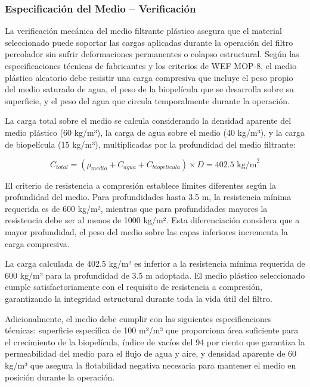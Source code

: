 \documentclass[12pt,a4paper]{article}
\begin{document}
\subsubsection{Especificación del Medio -- Verificación}

La verificación mecánica del medio filtrante plástico asegura que el material seleccionado puede soportar las cargas aplicadas durante la operación del filtro percolador sin sufrir deformaciones permanentes o colapso estructural. Según las especificaciones técnicas de fabricantes y los criterios de WEF MOP-8, el medio plástico aleatorio debe resistir una carga compresiva que incluye el peso propio del medio saturado de agua, el peso de la biopelícula que se desarrolla sobre su superficie, y el peso del agua que circula temporalmente durante la operación.

La carga total sobre el medio se calcula considerando la densidad aparente del medio plástico (60 kg/m³), la carga de agua sobre el medio (40 kg/m³), y la carga de biopelícula (15 kg/m³), multiplicadas por la profundidad del medio filtrante:

\begin{equation}
C_{total} = (\rho_{medio} + C_{agua} + C_{biopelicula}) \times D = 402.5 \text{ kg/m}^2
\end{equation}

El criterio de resistencia a compresión establece límites diferentes según la profundidad del medio. Para profundidades hasta 3.5 m, la resistencia mínima requerida es de 600 kg/m², mientras que para profundidades mayores la resistencia debe ser al menos de 1000 kg/m². Esta diferenciación considera que a mayor profundidad, el peso del medio sobre las capas inferiores incrementa la carga compresiva.

La carga calculada de 402.5 kg/m² es inferior a la resistencia mínima requerida de 600 kg/m² para la profundidad de 3.5 m adoptada. El medio plástico seleccionado cumple satisfactoriamente con el requisito de resistencia a compresión, garantizando la integridad estructural durante toda la vida útil del filtro.

Adicionalmente, el medio debe cumplir con las siguientes especificaciones técnicas: superficie específica de 100 m²/m³ que proporciona área suficiente para el crecimiento de la biopelícula, índice de vacíos del 94 por ciento que garantiza la permeabilidad del medio para el flujo de agua y aire, y densidad aparente de 60 kg/m³ que asegura la flotabilidad negativa necesaria para mantener el medio en posición durante la operación.
\end{document}
